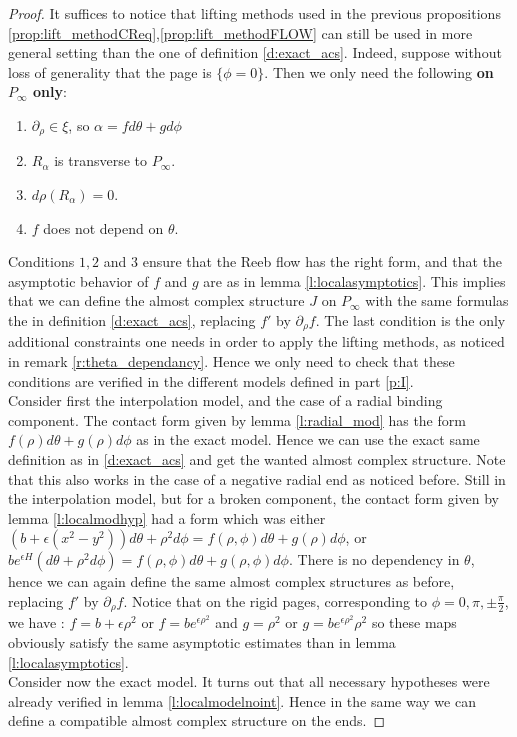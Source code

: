 \documentclass[../main.tex]{subfiles}
\begin{document}
\begin{proof}
It suffices to notice that lifting methods used in the previous propositions \ref{prop:lift_methodCReq},\ref{prop:lift_methodFLOW} can still be used in more general setting than the one of definition \ref{d:exact_acs}. Indeed, suppose without loss of generality that the page is $\{\phi = 0\}$. Then we only need the following \textbf{on $P_\infty$ only}:
\begin{enumerate}
\item $\partial_\rho\in \xi$, so $\alpha = fd\theta + gd\phi$
\item $R_\alpha$ is transverse to $P_\infty$.
\item $d\rho(R_\alpha) = 0$.
\item $f$ does not depend on $\theta$.
\end{enumerate}

Conditions $1,2$ and $3$ ensure that the Reeb flow has the right form, and that the asymptotic behavior of $f$ and $g$ are as in lemma \ref{l:localasymptotics}. This implies that we can define the almost complex structure $J$ on $P_\infty$ with the same formulas the in definition \ref{d:exact_acs}, replacing $f'$ by $\partial_\rho f$. The last condition is the only additional constraints one needs in order to apply the lifting methods, as noticed in remark \ref{r:theta_dependancy}. Hence we only need to check that these conditions are verified in the different models defined in part \ref{p:I}.\\


Consider first the interpolation model, and the case of a radial binding component. The contact form given by lemma \ref{l:radial_mod} has the form $f(\rho)d\theta + g(\rho) d\phi$ as in the exact model. Hence we can use the exact same definition as in \ref{d:exact_acs} and get the wanted almost complex structure. Note that this also works in the case of a negative radial end as noticed before. Still in the interpolation model, but for a broken component, the contact form given by lemma \ref{l:localmodhyp} had a form which was either $(b +\epsilon(x^2-y^2))d\theta + \rho^2d\phi = f(\rho,\phi)d\theta + g(\rho)d\phi$, or $be^{\epsilon H}(d\theta + \rho^2d\phi) = f(\rho,\phi)d\theta + g(\rho,\phi)d\phi$. There is no dependency in $\theta$, hence we can again define the same almost complex structures as before, replacing $f'$ by $\partial_\rho f$. Notice that on the rigid pages, corresponding to $\phi = 0,\pi,\pm\frac{\pi}{2}$, we have : $f = b + \epsilon \rho^2$ or $f= be^{\epsilon \rho^2}$ and $g = \rho^2$ or $g = be^{\epsilon \rho^2}\rho^2$ so these maps obviously satisfy the same asymptotic estimates than in lemma \ref{l:localasymptotics}.\\

Consider now the exact model. It turns out that all necessary hypotheses were already verified in lemma \ref{l:localmodelnoint}. Hence in the same way we can define a compatible almost complex structure on the ends. 
\end{proof}
\end{document}
